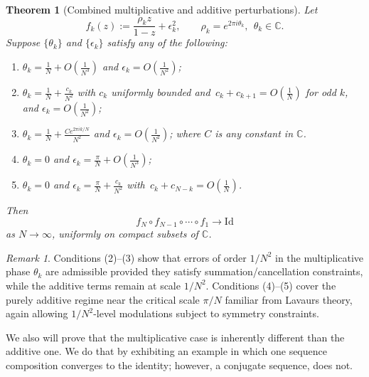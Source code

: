\documentclass{amsart}
\newtheorem{mainthm}{Theorem}
\theoremstyle{remark}
\newtheorem*{remark}{Remark}
\theoremstyle{definition}
\begin{document}
\begin{mainthm}[Combined multiplicative and additive perturbations]\label{thm:B}
Let
\[
   f_k(z) := \frac{\rho_k z}{1-z} + \epsilon_k^2, 
   \qquad \rho_k = e^{2\pi i \theta_k},\ \ \theta_k\in\mathbb{C}.
\]
Suppose \(\{\theta_k\}\) and \(\{\epsilon_k\}\) satisfy any of the following:
\begin{enumerate}
   \item \(\displaystyle \theta_k = \frac{1}{N} + O\!\left(\tfrac{1}{N^3}\right)\) and \(\displaystyle \epsilon_k = O\!\left(\tfrac{1}{N^2}\right)\);
   \item \(\displaystyle \theta_k = \frac{1}{N} + \frac{c_k}{N^2}\) with $c_k$ uniformly bounded and \(\, c_k+c_{k+1} =O\!\left(\tfrac{1}{N}\right)\) for odd \(k\), and \(\displaystyle \epsilon_k = O\!\left(\tfrac{1}{N^2}\right)\);
  \item $\displaystyle \theta_k = \frac{1}{N} + \frac{Ce^{2\pi i k/N}}{N^2}$  and \(\displaystyle \epsilon_k = O\!\left(\tfrac{1}{N^2}\right)\); where $C$ is any constant in $\mathbb{C}$.
   \item \(\displaystyle \theta_k = 0\) and \(\displaystyle \epsilon_k = \frac{\pi}{N} + O\!\left(\tfrac{1}{N^3}\right)\);
   \item \(\displaystyle \theta_k = 0\) and \(\displaystyle \epsilon_k = \frac{\pi}{N} + \frac{c_k}{N^2}\) with \(\,c_k + c_{N-k} = O\!\left(\tfrac{1}{N}\right)\).
\end{enumerate}
Then
\[
   f_N\circ f_{N-1}\circ \cdots\circ f_1 \longrightarrow \mathrm{Id}
\]
as \(N\to\infty\), uniformly on compact subsets of $\mathbb{C}$.
\end{mainthm}

\begin{remark}
Conditions (2)–(3) show that errors of order \(1/N^2\) in the multiplicative phase \(\theta_k\) are admissible provided they satisfy summation/cancellation constraints, while the additive terms remain at scale \(1/N^2\). Conditions (4)–(5) cover the purely additive regime near the critical scale \(\pi/N\) familiar from Lavaurs theory, again allowing \(1/N^2\)-level modulations subject to symmetry constraints.
\end{remark}

We also will prove that the multiplicative case is inherently different than the additive one. We do that by exhibiting an example in which one sequence composition converges to the identity; however, a conjugate sequence, does not. 
\end{document}
